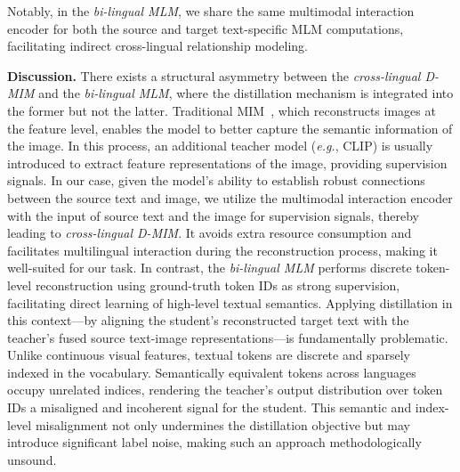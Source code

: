 \documentclass[10pt,journal,compsoc]{IEEEtran}
\begin{document}
Notably, in the \emph{bi-lingual MLM}, we share the same multimodal interaction encoder for both the source and target text-specific MLM computations, facilitating indirect cross-lingual relationship modeling.

\textbf{Discussion.}
There exists a structural asymmetry between the \emph{cross-lingual D-MIM} and the \emph{bi-lingual MLM}, where the distillation mechanism is integrated into the former but not the latter. 
Traditional MIM~\cite{wei2022mvp, hou2022milan}, which reconstructs images at the feature level, enables the model to better capture the semantic information of the image. 
In this process, an additional teacher model (\emph{e.g.}, CLIP) is usually introduced to extract feature representations of the image, providing supervision signals.
In our case, given the model's ability to establish robust connections between the source text and image, we utilize the multimodal interaction encoder with the input of source text and the image for supervision signals, thereby leading to \emph{cross-lingual D-MIM}. It avoids extra resource consumption and facilitates multilingual interaction during the reconstruction process, making it well-suited for our task.
In contrast, the \emph{bi-lingual MLM} performs discrete token-level reconstruction using ground-truth token IDs as strong supervision, facilitating direct learning of high-level textual semantics. Applying distillation in this context—by aligning the student's reconstructed target text with the teacher's fused source text-image representations—is fundamentally problematic. Unlike continuous visual features, textual tokens are discrete and sparsely indexed in the vocabulary. Semantically equivalent tokens across languages occupy unrelated indices, rendering the teacher's output distribution over token IDs a misaligned and incoherent signal for the student. This semantic and index-level misalignment not only undermines the distillation objective but may introduce significant label noise, making such an approach methodologically unsound.
\end{document}
